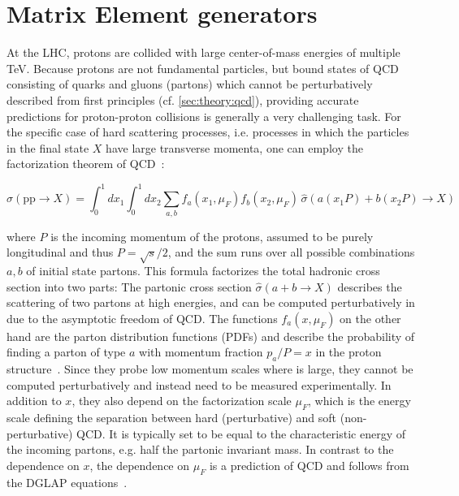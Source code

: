 \section{Matrix Element generators}
\label{sec:mc:me}


At the LHC, protons are collided with large center-of-mass energies of multiple TeV. Because protons are not fundamental particles, but bound states of QCD consisting of quarks and gluons (partons) which cannot be perturbatively described from first principles (cf. \cref{sec:theory:qcd}), providing accurate predictions for proton-proton collisions is generally a very challenging task. For the specific case of hard scattering processes, i.e. processes in which the particles in the final state $X$ have large transverse momenta, one can employ the factorization theorem of QCD~\cite{Peskin:1995ev}:

\begin{equation}
\label{eq:mc:sigmahad}
    \sigma (\mathrm{pp} \rightarrow X) = \int_{0}^{1} dx_1 \int_{0}^{1} dx_2 \sum_ {a,b} f_a (x_1, \mu_F) f_b (x_2, \mu_F) \, \hat{\sigma} (a (x_1 P) + b (x_2 P) \rightarrow X)
\end{equation}

\noindent where $P$ is the incoming momentum of the protons, assumed to be purely longitudinal and thus $P = \sqrt{s}/2$, and the sum runs over all possible combinations $a,b$ of initial state partons. This formula factorizes the total hadronic cross section into two parts: The partonic cross section $\hat{\sigma} (a + b \rightarrow X)$ describes the scattering of two partons at high energies, and can be computed perturbatively in \alphas due to the asymptotic freedom of QCD. The functions $f_a(x, \mu_F)$  on the other hand are the parton distribution functions (PDFs) and describe the probability of finding a parton of type $a$ with momentum fraction $p_a / P = x$ in the proton structure~\cite{Peskin:1995ev}. Since they probe low momentum scales where \alphas is large, they cannot be computed perturbatively and instead need to be measured experimentally. In addition to $x$, they also depend on the factorization scale $\mu_F$, which is the energy scale defining the separation between hard (perturbative) and soft (non-perturbative) QCD. It is typically set to be equal to the characteristic energy of the incoming partons, e.g. half the partonic invariant mass. In contrast to the dependence on $x$, the dependence on $\mu_F$ is a prediction of QCD and follows from the DGLAP equations~\cite{Altarelli:1977zs,Skands:2012ts}.


